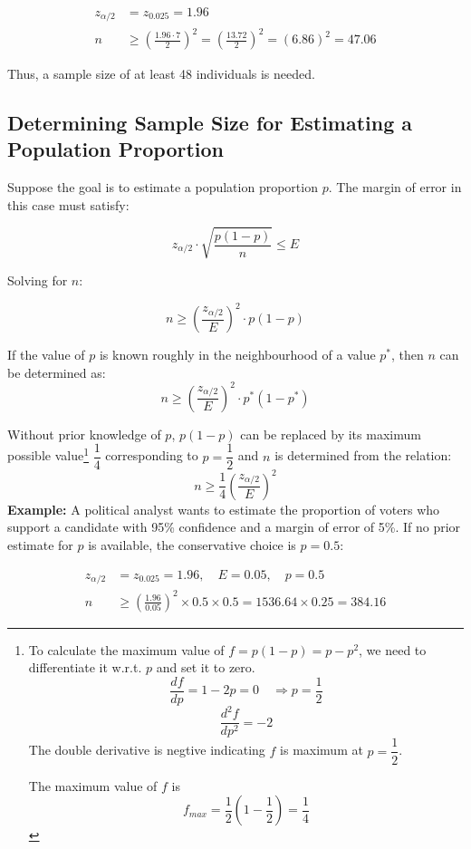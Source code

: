 \documentclass[twoside]{book}
\begin{document}
\begin{align*}
z_{\alpha/2} &= z_{0.025} = 1.96 \\
n &\geq \left( \frac{1.96 \cdot 7}{2} \right)^2 = \left( \frac{13.72}{2} \right)^2 = (6.86)^2 = 47.06
\end{align*}

Thus, a sample size of at least 48 individuals is needed.

\subsection{Determining Sample Size for Estimating a Population Proportion}

Suppose the goal is to estimate a population proportion \(p\). The margin of error in this case must satisfy:

\[
z_{\alpha/2} \cdot \sqrt{ \frac{p(1 - p)}{n} } \leq E
\]

Solving for \(n\):

\[
n \geq \left( \frac{z_{\alpha/2}}{E} \right)^2 \cdot p(1 - p)
\]

If the value of $p$ is known roughly in the neighbourhood of a value $p^*$, then $n$ can be determined as:
\[
n \geq \left( \frac{z_{\alpha/2}}{E} \right)^2 \cdot p^*(1 - p^*)
\]

Without prior knowledge of $p$, $p(1-p)$ can be replaced by its maximum possible value\footnote{To calculate the maximum value of $f=p(1-p) = p-p^2$, we need to differentiate it w.r.t. $p$ and set it to zero.
	$$\dfrac{df}{dp} = 1-2p = 0 \quad \Rightarrow p =\dfrac{1}{2}$$
$$\dfrac{d^2f}{dp^2}  = -2$$
The double derivative is negtive indicating $f$ is maximum at $p=\dfrac{1}{2}$.

\noindent The maximum value of $f$ is
$$f_{max} = \dfrac{1}{2}\left(1-\dfrac{1}{2}  \right) = \dfrac{1}{4}$$

} $\dfrac{1}{4}$ corresponding to $p=\dfrac{1}{2}$ and $n$ is determined from the relation:
\[
n \geq \dfrac{1}{4}\left( \frac{z_{\alpha/2}}{E} \right)^2
\]
\textbf{Example:} A political analyst wants to estimate the proportion of voters who support a candidate with 95\% confidence and a margin of error of 5\%. If no prior estimate for \(p\) is available, the conservative choice is \(p = 0.5\):

\begin{align*}
z_{\alpha/2} &= z_{0.025} = 1.96, \quad E = 0.05, \quad p = 0.5 \\
n &\geq \left( \frac{1.96}{0.05} \right)^2 \times 0.5 \times 0.5 = 1536.64 \times 0.25 = 384.16
\end{align*}
\end{document}
